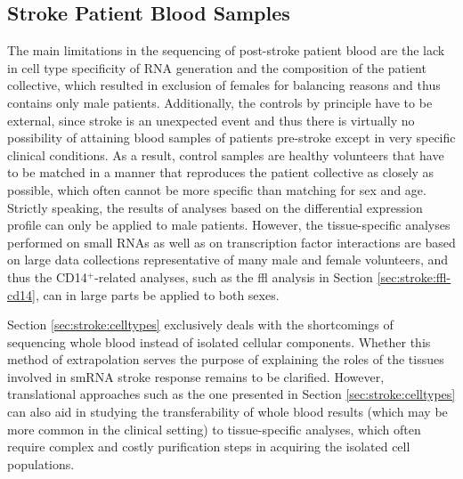 \subsection{Stroke Patient Blood Samples} \label{sec:discussion:stroke-blood}
The main limitations in the sequencing of post-stroke patient blood are the lack in cell type specificity of RNA generation and the composition of the patient collective, which resulted in exclusion of females for balancing reasons and thus contains only male patients. Additionally, the controls by principle have to be external, since stroke is an unexpected event and thus there is virtually no possibility of attaining blood samples of patients pre-stroke except in very specific clinical conditions. As a result, control samples are healthy volunteers that have to be matched in a manner that reproduces the patient collective as closely as possible, which often cannot be more specific than matching for sex and age. Strictly speaking, the results of analyses based on the differential expression profile can only be applied to male patients. However, the tissue-specific analyses performed on small RNAs as well as on transcription factor interactions are based on large data collections representative of many male and female volunteers, and thus the CD14$^+$-related analyses, such as the \acl{ffl} analysis in Section \ref{sec:stroke:ffl-cd14}, can in large parts be applied to both sexes.

Section \ref{sec:stroke:celltypes} exclusively deals with the shortcomings of sequencing whole blood instead of isolated cellular components. Whether this method of extrapolation serves the purpose of explaining the roles of the tissues involved in smRNA stroke response remains to be clarified. However, translational approaches such as the one presented in Section \ref{sec:stroke:celltypes} can also aid in studying the transferability of whole blood results (which may be more common in the clinical setting) to tissue-specific analyses, which often require complex and costly purification steps in acquiring the isolated cell populations.


